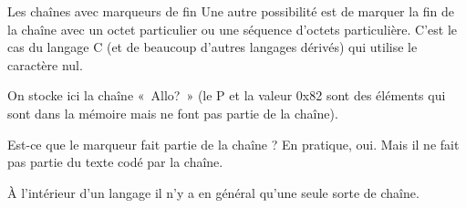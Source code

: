 \begin{frame}{Les chaînes avec marqueurs de fin}
  Une autre possibilité est de marquer la fin de la chaîne avec un octet
  particulier ou une séquence d'octets particulière.  C'est le cas du langage
  C (et de beaucoup d'autres langages dérivés) qui utilise le caractère nul.
  \begin{example}
    On stocke ici la chaîne «~Allo?~» (le P et la valeur 0x82 sont des
    éléments qui sont dans la mémoire mais ne font pas partie de la chaîne).

  \end{example}
  \begin{block}{Est-ce que le marqueur fait partie de la chaîne ?}
    En pratique, oui. Mais il ne fait pas partie du texte codé par la chaîne.

    À l'intérieur d'un langage il n'y a en général qu'une seule sorte de
    chaîne.
  \end{block}
\end{frame}
